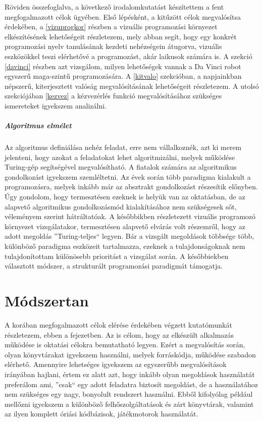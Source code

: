 \documentclass[12pt,a4paper,oneside]{report} %
\begin{document}
\par Röviden összefoglalva, a következő irodalomkutatást készítettem a fent megfogalmazott célok ügyében. Első lépésként, a kitűzött célok  megvalósítsa érdekében, a \ref{vizuprogkor} részben a vizuális programozási környezet elkészítésének lehetőségeit részletezem, mely abban segít, hogy egy konkrét programozási nyelv tanulásának kezdeti nehézségein átugorva, vizuális eszközökkel teszi elérhetővé a programozást, akár laikusok számára is. A  szekció \ref{davinci} részben azt vizsgálom, milyen lehetőségek vannak a Da Vinci robot egyszerű maga-szintű programozására. A \ref{kitvalo} szekcióban, a napjainkban népszerű, kiterjesztett valóság megvalósításának lehetőségeit részletezem. A  utolsó szekciójában \ref{kezvez} a kézvezérlés funkció megvalósításához szükséges ismereteket igyekszem analizálni.

\paragraph{Algoritmus elmélet}
Az algoritmus definiálása nehéz feladat, erre nem vállalkoznék, azt ki merem jelenteni, hogy azokat a feladatokat lehet algoritmizálni, melyek működése Turing-gép segítségével megvalósítható. A fiatalok számára az algoritmikus gondolkozást igyekszem szemléltetni. Az évek során több paradigma kialakult a programozásra, melyek inkább már az absztrakt gondolkozást részesítik előnyben. Úgy gondolom, hogy termesztésen ezeknek is helyük van az oktatásban, de az alapvető algoritmikus gondolkozásmód kialakításához nem szükségesek sőt, véleményem szerint hátráltatóak. A későbbikben részletezett vizuális programozó környezet vizsgálatakor, termesztésen alapvető elvárás volt részemről, hogy az adott megoldás ''Turing-teljes`` legyen. Bár a vizsgált megoldások többsége több, különböző paradigma eszközeit tartalmazza, ezeknek a tulajdonságoknak nem tulajdonítottam különösebb prioritást a vizsgálat során. A későbbiekben választott módszer, a strukturált programozási paradigmát támogatja.

\chapter{Módszertan}
\label{modtan}
A korában megfogalmazott célok elérése érdekében végzett kutatómunkát részletezem, ebben a fejezetben.
Az is célom, hogy az elkészült alkalmazás működése is oktatási célokra bemutatható legyen. Ezért a megvalósítás során, olyan könyvtárakat igyekszem használni,  melyek forráskódja, működése szabadon elérhető. Amennyire lehetséges igyekszem az egyszerűbb megvalósítások irányában hajlani, értem ez alatt azt, hogy inkább olyan megoldások használatát preferálom ami, ''csak`` egy adott feladatra biztosít megoldást, de a használatához nem szükséges egy nagy, bonyolult rendszert használni. Ebből  kifolyólag például mellőzni igyekszem a különböző felhőszolgáltatások és zárt könyvtárak, valamint az ilyen komplett óriási kódbázisok, játékmotorok használatát.
\end{document}
